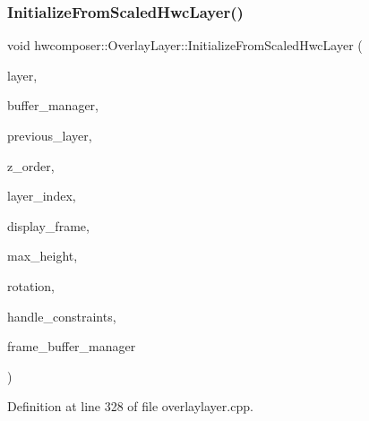 \subsubsection{\texorpdfstring{Initialize\+From\+Scaled\+Hwc\+Layer()}{InitializeFromScaledHwcLayer()}}
{\footnotesize\ttfamily void hwcomposer\+::\+Overlay\+Layer\+::\+Initialize\+From\+Scaled\+Hwc\+Layer (\begin{DoxyParamCaption}\item[{\mbox{\hyperlink{structhwcomposer_1_1HwcLayer}{Hwc\+Layer}} $\ast$}]{layer,  }\item[{\mbox{\hyperlink{classhwcomposer_1_1ResourceManager}{Resource\+Manager}} $\ast$}]{buffer\+\_\+manager,  }\item[{\mbox{\hyperlink{structhwcomposer_1_1OverlayLayer}{Overlay\+Layer}} $\ast$}]{previous\+\_\+layer,  }\item[{uint32\+\_\+t}]{z\+\_\+order,  }\item[{uint32\+\_\+t}]{layer\+\_\+index,  }\item[{const Hwc\+Rect$<$ int $>$ \&}]{display\+\_\+frame,  }\item[{uint32\+\_\+t}]{max\+\_\+height,  }\item[{uint32\+\_\+t}]{rotation,  }\item[{bool}]{handle\+\_\+constraints,  }\item[{\mbox{\hyperlink{classhwcomposer_1_1FrameBufferManager}{Frame\+Buffer\+Manager}} $\ast$}]{frame\+\_\+buffer\+\_\+manager }\end{DoxyParamCaption})}



Definition at line 328 of file overlaylayer.\+cpp.


\begin{DoxyCode}{0}
\end{DoxyCode}
\mbox{\label{structhwcomposer_1_1OverlayLayer_afe4cd078f602d747f16a8099d1446904}} 
